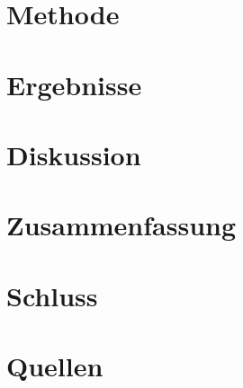 \documentclass[
	ngerman,
	ruledheaders=section,%
	class=report,%
	thesis={type=master},%
	accentcolor=9c,%
	custommargins=true,%
	marginpar=false,%
	parskip=half-,%
	fontsize=11pt,%
]{tudapub}
\begin{document}
\chapter{Methode}
\chapter{Ergebnisse}
	
\chapter{Diskussion}
\chapter{Zusammenfassung}
\chapter{Schluss}

\chapter{Quellen}
\printbibliography
\end{document}
